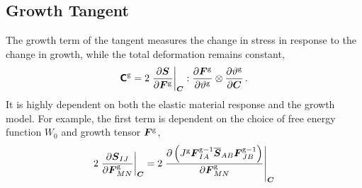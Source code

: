 \documentclass[10pt,letterpaper,oneside]{report}
\newcommand{\ten}[1]{\mbox{\boldmath $#1$}{}}
\newcommand{\tenf}[1]{\mbox{{\sffamily{\bfseries {#1}}}}}
\newcommand{\scas}[1]{\mbox{{\scriptsize{${\rm{#1}}$}}}{}}
\newcommand{\tens}[1]{\mbox{\boldmath{\scriptsize{$#1$}}}{}}
\begin{document}
\begin{itemize}
\subsection{Growth Tangent}
\label{subsec:growth_tangent}
The growth term of the tangent measures the change in stress in response to the change in growth, while the total deformation remains constant, 
\begin{equation}
\tenf{C}^{\scas{g}} = 2 \left. \frac{\partial \ten{S} }{\partial \ten{F}^{\scas{g}} } \right|_{\tens{C}} : \frac{\partial \ten{F}^{\scas{g}} }{\partial \vartheta^{\scas{g}}} \otimes \frac{ \partial \vartheta^{\scas{g}} }{ \partial \ten{C} } \, .  
\end{equation}
It is highly dependent on both the elastic material response and the growth model.  For example, the first term is dependent on the choice of free energy function $W_0$ and growth tensor $\ten{F}^{\scas{g}}$, 
\begin{align}
2 \left. \frac{\partial \ten{S}_{IJ}}{\partial \ten{F}^{\scas{g}}_{MN}} \right|_{\tens{C}} 
={}& 2 \left. \frac{\partial \left( J^{\scas{g}} \ten{F}^{\scas{g}-1}_{IA} \overline{\ten{S}}_{AB} \ten{F}^{\scas{g}-1}_{JB} \right) }{\partial \ten{F}^{\scas{g}}_{MN}} \right|_{\tens{C}} 
\\

\end{align}
\end{itemize}
\end{document}
